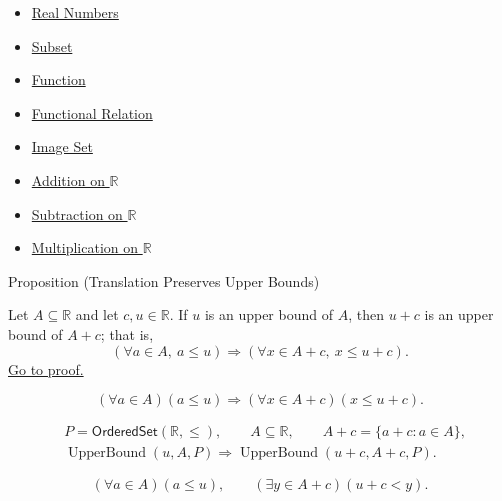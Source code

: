 \begin{dependencies}
\begin{itemize}
  \item \hyperref[def:reals]{Real Numbers}
  \item \hyperref[def:subset]{Subset}
  \item \hyperref[def:function]{Function}
  \item \hyperref[def:functional-relation]{Functional Relation}
  \item \hyperref[def:image-set]{Image Set}
  \item \hyperref[def:addition-on-r]{Addition on $\mathbb{R}$}
  \item \hyperref[def:subtraction-on-r]{Subtraction on $\mathbb{R}$}
  \item \hyperref[def:multiplication-on-r]{Multiplication on $\mathbb{R}$}
\end{itemize}
\end{dependencies}

\begin{propositionbox}{Proposition (Translation Preserves Upper Bounds)}
\begin{proposition}
\label{prop:translation-preserves-upper-bounds}
Let $A\subseteq\mathbb{R}$ and let $c,u\in\mathbb{R}$.  If $u$ is an
upper bound of $A$, then $u+c$ is an upper bound of $A+c$; that is,
\[
\left(\forall a\in A,\ a\leq u\right)
\Longrightarrow
\left(\forall x\in A+c,\ x\leq u+c\right).
\]
\hyperref[prf:translation-preserves-upper-bounds]{Go to proof.}
\end{proposition}
\end{propositionbox}

\begin{remark*}
\[
(\forall a\in A)(a\leq u)
\Longrightarrow
(\forall x\in A+c)(x\leq u+c).
\]
\end{remark*}

\begin{remark*}
\[
\begin{aligned}
&P=\mathsf{OrderedSet}(\mathbb{R},\leq),\qquad
A\subseteq\mathbb{R},\qquad A+c=\{a+c:a\in A\},\\
&\operatorname{UpperBound}(u,A,P)\Longrightarrow\operatorname{UpperBound}(u+c,A+c,P).
\end{aligned}
\]
\end{remark*}

\begin{remark*}
\[
(\forall a\in A)(a\leq u),\qquad
(\exists y\in A+c)(u+c<y).
\]
\end{remark*}


